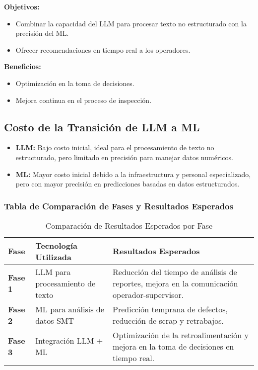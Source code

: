 \textbf{Objetivos:}
\begin{itemize}
    \item Combinar la capacidad del LLM para procesar texto no estructurado con la precisión del ML.
    \item Ofrecer recomendaciones en tiempo real a los operadores.
\end{itemize}

\textbf{Beneficios:}
\begin{itemize}
    \item Optimización en la toma de decisiones.
    \item Mejora continua en el proceso de inspección.
\end{itemize}

\subsection{Costo de la Transición de LLM a ML}

\begin{itemize}
    \item \textbf{LLM:} Bajo costo inicial, ideal para el procesamiento de texto no estructurado, pero limitado en precisión para manejar datos numéricos.
    \item \textbf{ML:} Mayor costo inicial debido a la infraestructura y personal especializado, pero con mayor precisión en predicciones basadas en datos estructurados.
\end{itemize}



\subsubsection{Tabla de Comparación de Fases y Resultados Esperados}

\begin{table}[htbp]
\centering
\caption{Comparación de Resultados Esperados por Fase}
\begin{tabularx}{\textwidth}{|X|X|X|}
\hline
\textbf{Fase} & \textbf{Tecnología Utilizada} & \textbf{Resultados Esperados} \\
\hline
\textbf{Fase 1} & LLM para procesamiento de texto & Reducción del tiempo de análisis de reportes, mejora en la comunicación operador-supervisor. \\
\hline
\textbf{Fase 2} & ML para análisis de datos SMT & Predicción temprana de defectos, reducción de scrap y retrabajos. \\
\hline
\textbf{Fase 3} & Integración LLM + ML & Optimización de la retroalimentación y mejora en la toma de decisiones en tiempo real. \\
\hline
\end{tabularx}
\end{table}
